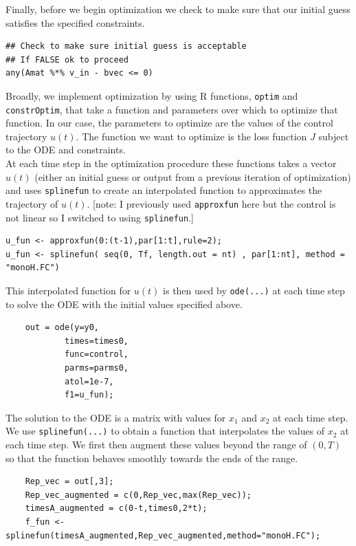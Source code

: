 \documentclass[12pt, oneside]{article}   	%
\begin{document}
\noindent Finally, before we begin optimization we check to make sure that our initial guess satisfies the specified constraints. 

\begin{lstlisting}
## Check to make sure initial guess is acceptable 
## If FALSE ok to proceed
any(Amat %*% v_in - bvec <= 0)

\end{lstlisting}

\noindent Broadly, we implement optimization by using R functions, \lstinline{optim} and \lstinline{constrOptim}, that take a function and parameters over which to optimize that function. In our case, the parameters to optimize are the values of the control trajectory $u(t)$. The function we want to optimize is the loss function $J$ subject to the ODE and constraints. \\

\noindent At each time step in the optimization procedure these functions takes a vector $u(t)$ (either an initial guess or output from a previous iteration of optimization) and uses \lstinline{splinefun} to create an interpolated function to approximates the trajectory of $u(t)$. [note: I previously used \lstinline{approxfun} here but the control is not linear so I switched to using \lstinline{splinefun}.]

\begin{lstlisting}
u_fun <- approxfun(0:(t-1),par[1:t],rule=2);
u_fun <- splinefun( seq(0, Tf, length.out = nt) , par[1:nt], method = "monoH.FC")
\end{lstlisting}

\noindent This interpolated function for $u(t)$ is then used by \lstinline{ode(...)} at each time step to solve the ODE with the initial values specified above. 

\begin{lstlisting}
    out = ode(y=y0,
            times=times0,
            func=control,
            parms=parms0, 
            atol=1e-7,
            f1=u_fun);
  \end{lstlisting}  

\noindent The solution to the ODE is a matrix with values for $x_1$ and $x_2$ at each time step. We use \lstinline{splinefun(...)} to obtain a function that interpolates the values of $x_2$ at each time step. We first then augment these values beyond the range of $(0,T)$ so that the function behaves smoothly towards the ends of the range. 

\begin{lstlisting}  
    Rep_vec = out[,3];
    Rep_vec_augmented = c(0,Rep_vec,max(Rep_vec));
    timesA_augmented = c(0-t,times0,2*t);
    f_fun <- splinefun(timesA_augmented,Rep_vec_augmented,method="monoH.FC");
\end{lstlisting}
\end{document}
